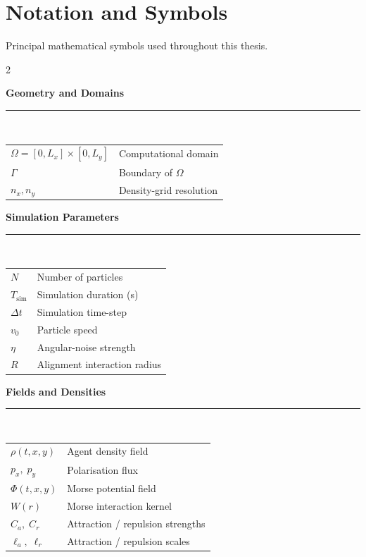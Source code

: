 \chapter*{Notation and Symbols}

\noindent
{\small Principal mathematical symbols used throughout this thesis.}

\smallskip
\begin{multicols}{2}
{\footnotesize
\renewcommand{\arraystretch}{0.78}
\setlength{\tabcolsep}{2pt}

\noindent\textbf{Geometry and Domains}\\[-2pt]
\rule{\columnwidth}{0.4pt}\\[2pt]
\begin{tabular}{@{}p{}p{}@{}}
$\Omega=[0,L_x]\!\times\![0,L_y]$ & Computational domain \\
$\Gamma$ & Boundary of $\Omega$ \\
$n_x, n_y$ & Density-grid resolution \\
\end{tabular}

\vspace{3pt}\noindent\textbf{Simulation Parameters}\\[-2pt]
\rule{\columnwidth}{0.4pt}\\[2pt]
\begin{tabular}{@{}p{}p{}@{}}
$N$ & Number of particles \\
$T_{\mathrm{sim}}$ & Simulation duration (s) \\
$\Delta t$ & Simulation time-step \\
$v_0$ & Particle speed \\
$\eta$ & Angular-noise strength \\
$R$ & Alignment interaction radius \\
\end{tabular}

\vspace{3pt}\noindent\textbf{Fields and Densities}\\[-2pt]
\rule{\columnwidth}{0.4pt}\\[2pt]
\begin{tabular}{@{}p{}p{}@{}}
$\rho(t,x,y)$ & Agent density field \\
$p_x,\;p_y$ & Polarisation flux \\
$\Phi(t,x,y)$ & Morse potential field \\
$W(r)$ & Morse interaction kernel \\
$C_a,\;C_r$ & Attraction / repulsion strengths \\
$\ell_a,\;\ell_r$ & Attraction / repulsion scales \\
\end{tabular}

}
\end{multicols}
